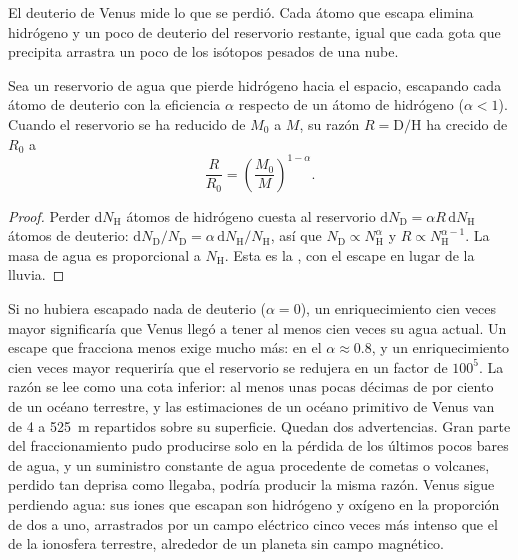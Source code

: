 El deuterio de Venus mide lo que se perdió. Cada átomo que escapa
elimina hidrógeno y un poco de deuterio del reservorio restante, igual que
cada gota que precipita arrastra un poco de los isótopos pesados de una
nube.

\begin{proposition}\label{prop:b3:planetary-atmospheres:dh}
Sea un reservorio de agua que pierde hidrógeno hacia el espacio, escapando cada átomo de deuterio
con la eficiencia $\alpha$ respecto de un átomo de hidrógeno
($\alpha < 1$). Cuando el reservorio se ha reducido de $M_0$ a $M$, su razón
$R = \mathrm{D}/\mathrm{H}$ ha crecido de $R_0$ a
\[
\frac R{R_0} = \left(\frac{M_0}M\right)^{1-\alpha}.
\]
\end{proposition}

\begin{proof}
Perder $\mathrm dN_\mathrm H$ átomos de hidrógeno cuesta al reservorio
$\mathrm dN_\mathrm D = \alpha R\,\mathrm dN_\mathrm H$ átomos de deuterio:
$\mathrm dN_\mathrm D/N_\mathrm D = \alpha\,\mathrm dN_\mathrm H/
N_\mathrm H$, así que $N_\mathrm D \propto N_\mathrm H^\alpha$ y $R \propto
N_\mathrm H^{\alpha - 1}$. La masa de agua es proporcional a
$N_\mathrm H$. Esta es la , con el escape en lugar de
la lluvia.
\end{proof}

Si no hubiera escapado nada de deuterio ($\alpha = 0$), un enriquecimiento cien veces mayor
significaría que Venus llegó a tener al menos cien veces su agua actual. Un escape que fracciona menos
exige mucho más: en el 
$\alpha \approx 0.8$, y un enriquecimiento cien veces mayor requeriría que el reservorio
se redujera en un factor de $100^5$. La razón se lee como una cota inferior:
al menos unas pocas décimas de por ciento de un océano terrestre,
y las estimaciones de un océano primitivo de Venus van de 4 a \qty{525}{m} repartidos
sobre su superficie. Quedan dos advertencias. Gran parte del fraccionamiento pudo producirse
solo en la pérdida de los últimos pocos bares de agua, y un suministro constante
de agua procedente de cometas o volcanes, perdido tan deprisa como llegaba, podría producir
la misma razón. Venus sigue perdiendo agua: sus iones que escapan son hidrógeno y oxígeno
en la proporción de dos a uno, arrastrados por un campo eléctrico
cinco veces más intenso que el de la ionosfera terrestre,
alrededor de un planeta sin campo magnético.

